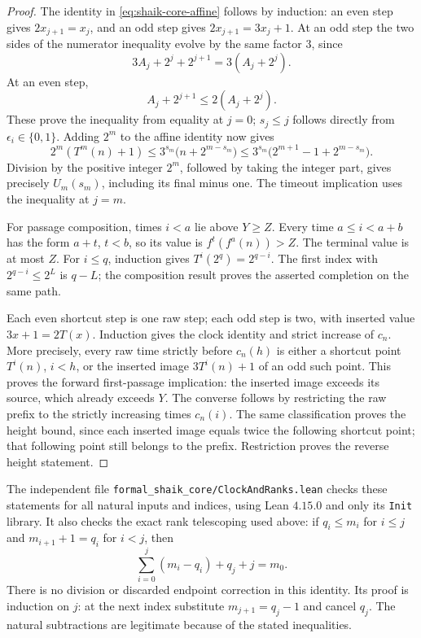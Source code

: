\documentclass[11pt]{article}
\theoremstyle{remark}\newtheorem{remark}[proposition]{Remark}
\begin{document}
\begin{proof}
The identity in \eqref{eq:shaik-core-affine} follows by induction:
an even step gives \(2x_{j+1}=x_j\), and an odd step gives
\(2x_{j+1}=3x_j+1\). At an odd step the two sides of the
numerator inequality evolve by the same factor \(3\), since
\[
 3A_j+2^j+2^{j+1}=3(A_j+2^j).
\]
At an even step,
\[
 A_j+2^{j+1}\le2(A_j+2^j).
\]
These prove the inequality from equality at \(j=0\); \(s_j\le j\)
follows directly from \(\epsilon_i\in\{0,1\}\).
Adding \(2^m\) to the affine identity now gives
\[
 2^m(T^m(n)+1)
 \le 3^{s_m}\bigl(n+2^{m-s_m}\bigr)
 \le 3^{s_m}\bigl(2^{m+1}-1+2^{m-s_m}\bigr).
\]
Division by the positive integer \(2^m\), followed by taking the
integer part, gives precisely \(U_m(s_m)\), including its final
minus one. The timeout implication uses the inequality at \(j=m\).

For passage composition, times \(i<a\) lie above \(Y\ge Z\).
Every time \(a\le i<a+b\) has the form \(a+t\), \(t<b\), so
its value is \(f^t(f^a(n))>Z\). The terminal value is at most \(Z\).
For \(i\le q\), induction gives \(T^i(2^q)=2^{q-i}\).
The first index with \(2^{q-i}\le2^L\) is \(q-L\);
the composition result proves the asserted completion on the same path.

Each even shortcut step is one raw step; each odd step is two,
with inserted value \(3x+1=2T(x)\).
Induction gives the clock identity and strict increase of \(c_n\).
More precisely, every raw time strictly before \(c_n(h)\) is either
a shortcut point \(T^i(n)\), \(i<h\), or the inserted image
\(3T^i(n)+1\) of an odd such point. This proves the forward
first-passage implication: the inserted image exceeds its source,
which already exceeds \(Y\). The converse follows by restricting
the raw prefix to the strictly increasing times \(c_n(i)\).
The same classification proves the height bound, since each inserted
image equals twice the following shortcut point; that following
point still belongs to the prefix. Restriction proves the reverse
height statement.
\end{proof}

The independent file \texttt{formal\_shaik\_core/ClockAndRanks.lean}
checks these statements for all natural inputs and indices, using
Lean \(4.15.0\) and only its \texttt{Init} library.
It also checks the exact rank telescoping used above:
if \(q_i\le m_i\) for \(i\le j\) and \(m_{i+1}+1=q_i\) for \(i<j\), then
\[
 \sum_{i=0}^j(m_i-q_i)+q_j+j=m_0.
\]
There is no division or discarded endpoint correction in this identity.
Its proof is induction on \(j\): at the next index substitute
\(m_{j+1}=q_j-1\) and cancel \(q_j\). The natural subtractions are
legitimate because of the stated inequalities.
\end{document}
